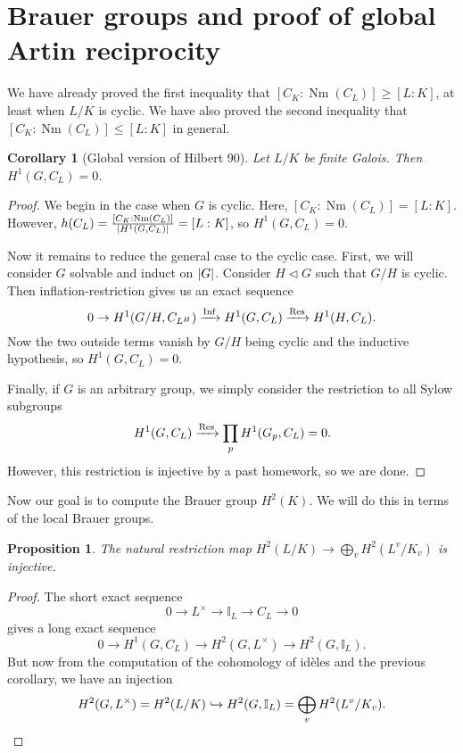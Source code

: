\documentclass[leqno, openany]{memoir}
\newtheorem{cor}[thm]{Corollary}
\newtheorem{prop}[thm]{Proposition}
\theoremstyle{definition}
\theoremstyle{remark}
\theoremstyle{plain}
\theoremstyle{definition}
\theoremstyle{remark}
\newcommand{\I}{\mathbb{I}}
\DeclareMathOperator{\Inf}{Inf}
\DeclareMathOperator{\Nm}{Nm}
\begin{document}
\section{Brauer groups and proof of global Artin reciprocity}%
\label{sec:brauer_groups_and_proof_of_artin_reciprocity}

We have already proved the first inequality that $[C_K : \Nm(C_L)] \geq [L:K]$,
at least when $L/K$ is cyclic. We have also proved the second inequality that
$[C_K:\Nm(C_L)] \leq [L:K]$ in general.

\begin{cor}[Global version of Hilbert 90] Let $L/K$ be finite Galois. Then
$H^1(G, C_L) = 0$.  \end{cor}

\begin{proof} We begin in the case when $G$ is cyclic. Here, $[C_K : \Nm(C_L)]
    = [L:K]$. However, $h(C_L) = \frac{[C_K:\Nm(C_L)]}{\abs{H^1(G, C_L)}} =
    [L:K]$, so $H^1(G, C_L) = 0$.

    Now it remains to reduce the general case to the cyclic case. First, we
    will consider $G$ solvable and induct on $\abs{G}$. Consider $H
    \triangleleft G$ such that $G/H$ is cyclic. Then inflation-restriction
    gives us an exact sequence \[ 0 \to H^1(G/H, C_{L^H}) \xrightarrow{\Inf}
    H^1(G, C_L) \xrightarrow{\Res} H^1(H, C_L). \] Now the two outside terms
    vanish by $G/H$ being cyclic and the inductive hypothesis, so $H^1(G, C_L)
    = 0$.

    Finally, if $G$ is an arbitrary group, we simply consider the restriction
    to all Sylow subgroups \[ H^1(G, C_L) \xrightarrow{\Res} \prod_p H^1(G_p,
    C_L) = 0. \] However, this restriction is injective by a past homework, so
    we are done.  \end{proof}

Now our goal is to compute the Brauer group $H^2(K)$. We will do this in terms
of the local Brauer groups.

\begin{prop} The natural restriction map $H^2(L/K) \to \bigoplus_v
H^2(L^v/K_v)$ is injective.  \end{prop}

\begin{proof} The short exact sequence \[ 0 \to L^{\times} \to \I_L \to C_L \to
    0 \] gives a long exact sequence \[ 0 \to H^1(G, C_L) \to H^2(G,
L^{\times}) \to H^2(G, \I_L). \] But now from the computation of the cohomology
of id\`eles and the previous corollary, we have an injection \[ H^2(G,
L^{\times}) = H^2(L/K) \hookrightarrow H^2(G, \I_L) = \bigoplus_v H^2(L^v/K_v).
\qedhere \] \end{proof}
\end{document}
